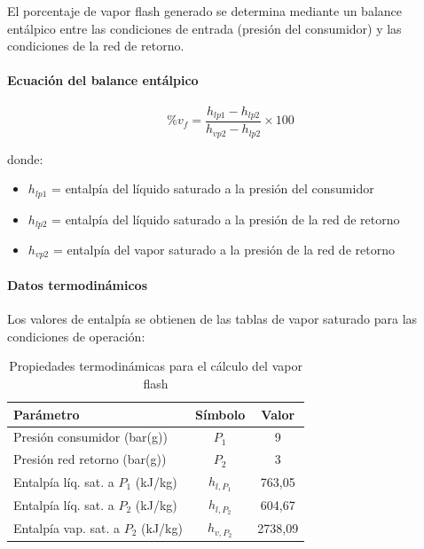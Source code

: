 \documentclass[12pt]{article}
\begin{document}
El porcentaje de vapor flash generado se determina mediante un balance entálpico entre las condiciones de entrada (presión del consumidor) y las condiciones de la red de retorno.

\paragraph{Ecuación del balance entálpico}

\begin{equation}
	\%v_f = \frac{h_{lp1} - h_{lp2}}{h_{vp2} - h_{lp2}} \times 100
	\label{eq:vapor-flash}
\end{equation}

donde:
\begin{itemize}[noitemsep]
	\item $h_{lp1}$ = entalpía del líquido saturado a la presión del consumidor
	\item $h_{lp2}$ = entalpía del líquido saturado a la presión de la red de retorno
	\item $h_{vp2}$ = entalpía del vapor saturado a la presión de la red de retorno
\end{itemize}

\paragraph{Datos termodinámicos}

Los valores de entalpía se obtienen de las tablas de vapor saturado para las condiciones de operación:

\begin{table}[H]
	\centering
	\caption{Propiedades termodinámicas para el cálculo del vapor flash}
	\label{tab:propiedades-flash}
	\begin{tabular}{lcc}
		\toprule
		\textbf{Parámetro}                 & \textbf{Símbolo} & \textbf{Valor} \\
		\midrule
		Presión consumidor (bar(g))        & $P_1$            & 9              \\
		Presión red retorno (bar(g))       & $P_2$            & 3              \\
		Entalpía líq. sat. a $P_1$ (kJ/kg) & $h_{l,P_1}$      & 763{,}05       \\
		Entalpía líq. sat. a $P_2$ (kJ/kg) & $h_{l,P_2}$      & 604{,}67       \\
		Entalpía vap. sat. a $P_2$ (kJ/kg) & $h_{v,P_2}$      & 2738{,}09     \\
		\bottomrule
	\end{tabular}
\end{table}
\end{document}
